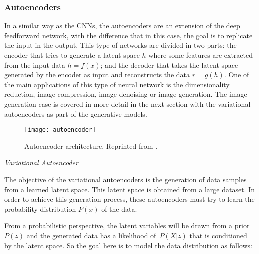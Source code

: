 \subsubsection{Autoencoders}

In a similar way as the CNNs, the autoencoders are an extension of the deep feedforward network, with the difference that in this case, the goal is to replicate the input in the output. This type of networks are divided in two parts: the encoder that tries to generate a latent space \begin{math}h\end{math} where some features are extracted from the input data \begin{math} h = f(x) \end{math}; and the decoder that takes the latent space generated by the encoder as input and reconstructs the data \begin{math} r = g(h) \end{math}. One of the main applications of this type of neural network is the dimensionality reduction, image compression, image denoising or image generation. The image generation case is covered in more detail in the next section with the variational autoencoders as part of the generative models.

\begin{figure}[htb]
  \centering
  \texttt{[image: autoencoder]}
  \caption[Autoencoder architecture]{Autoencoder architecture. Reprinted from \cite{canchumuni_emerick_pacheco_2019}.}
  \label{fig:autoencoder}
\end{figure}

\textit{Variational Autoencoder}

The objective of the variational autoencoders \cite{Kingma2014} is the generation of data samples from a learned latent space. This latent space is obtained from a large dataset. In order to achieve this generation process, these autoencoders must try to learn the probability distribution \begin{math} P(x) \end{math} of the data.

From a probabilistic perspective, the latent variables will be drawn from a prior \begin{math} P(z) \end{math} and the generated data has a likelihood of \begin{math} P(X|z) \end{math} that is conditioned by the latent space. So the goal here is to model the data distribution as follows:

